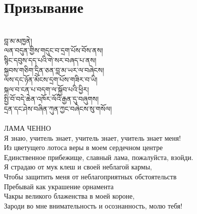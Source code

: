 \section{Призывание}
\\
\ti
བླ་མ་མཁྱནེ།\\
ལན་བདུན་གྱིས་གདུང་བ་དྲག་པོས་བོས་ནས།\\
སྙིང་དབུས་དད་པའི་གེ་སར་བཞད་པ་ནས།\\
སྐྱབས་གཅིག་དྲིན་ཅན་བླ་མ་ཡར་ལ་བཞེངས།\\
ལས་དང་ཉོན་མོངས་དྲག་པོས་གཟིར་བ་ཡི།\\
སྐལ་བ་ངན་པ་བདག་ལ་སྐྱོབ་པའི་ཕྱིར།\\
སྤྱི་བོ་བདེ་ཆེན་འཁོར་ལོའི་རྒྱན་དུ་བཞུགས།\\
དྲན་དང་ཤེས་བཞིན་ཀུན་ཀྱང་བཞེངས་སུ་གསོལ།\\
\\
\ru
ЛАМА ЧЕННО\\
Я знаю, учитель знает, учитель знает, учитель знает меня!\\
Из цветущего лотоса веры в моем сердечном центре \\
Единственное прибежище, славный лама, пожалуйста, взойди.\\
Я страдаю от мук клеш и своей неблагой кармы,\\
Чтобы защитить меня от неблагоприятных обстоятельств\\
Пребывай как украшение орнамента \\
Чакры великого блаженства в моей короне, \\
Зароди во мне внимательность и осознанность, молю тебя!\\

